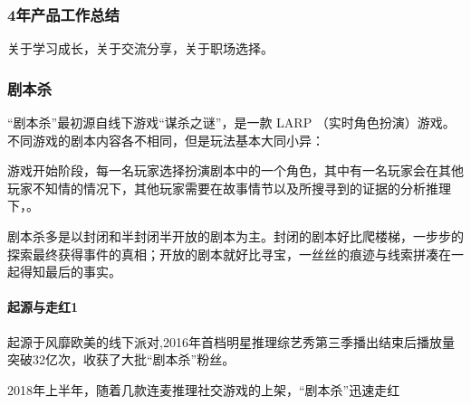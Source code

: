 \documentclass[letterpaper,11pt,english]{sphinxmanual}
\begin{document}
\subsubsection{4年产品工作总结}
\label{\detokenize{chapter_experience/4years:id1}}\label{\detokenize{chapter_experience/4years::doc}}
关于学习成长，关于交流分享，关于职场选择。


\subsubsection{剧本杀}
\label{\detokenize{chapter_experience/jubensha:id1}}\label{\detokenize{chapter_experience/jubensha::doc}}
“剧本杀”最初源自线下游戏“谋杀之谜”，是一款 LARP
（实时角色扮演）游戏。不同游戏的剧本内容各不相同，但是玩法基本大同小异：

游戏开始阶段，每一名玩家选择扮演剧本中的一个角色，其中有一名玩家会在其他玩家不知情的情况下，其他玩家需要在故事情节以及所搜寻到的证据的分析推理下，。

剧本杀多是以封闭和半封闭半开放的剧本为主。封闭的剧本好比爬楼梯，一步步的探索最终获得事件的真相；开放的剧本就好比寻宝，一丝丝的痕迹与线索拼凑在一起得知最后的事实。


\paragraph{起源与走红1\sphinxfootnotemark[620]}
\label{\detokenize{chapter_experience/jubensha:id2}}%
\begin{footnotetext}[620]\sphinxAtStartFootnote
{}
%
\end{footnotetext}\ignorespaces 
起源于风靡欧美的线下派对,2016年首档明星推理综艺秀第三季播出结束后播放量突破32亿次，收获了大批“剧本杀”粉丝。

2018年上半年，随着几款连麦推理社交游戏的上架，“剧本杀”迅速走红
\end{document}
